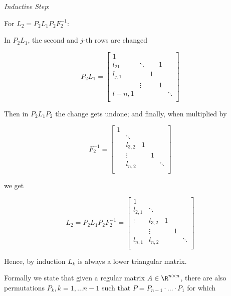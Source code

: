 \emph{Inductive Step}:

For \(L_2 = P_2 L_1 P_2 F_{2}^{-1}\): 

In \(P_2 L_1\), the second and \(j\)-th rows are changed

\[
    P_2 L_1= 
        \begin{bmatrix}
            1 &        &         &   &        \\
             l_{2 1}& \ddots &         &  1 &        \\
             l_{j,1} &        & 1       &   &        \\
            & \vdots       &  & 1 &        \\
            l-{n,1} &        &        &   & \ddots \\
        \end{bmatrix}
\]

Then in \(P_2 L_1 P_2\) the change gets undone; and finally, when multiplied by 

\[
    F_{2}^{-1} =     
        \begin{bmatrix}
            1 &        &         &   &        \\
              & \ddots &         &   &        \\
              &  l_{3,2}     & 1       &   &        \\
              &   \vdots    &  & 1 &        \\
              &  l_{n,2}      &        &   & \ddots \\
        \end{bmatrix}
\]

we get 

\[
    L_2 = P_2 L_1 P_2 F_{2}^{-1} =     
        \begin{bmatrix}
            1 &        &         &   &        \\
            l_{2,1}  & \ddots &         &   &        \\
            \vdots  &  l_{3,2}     & 1       &   &        \\
              &   \vdots    &  & 1 &        \\
            l_{n, 1}  &  l_{n,2}      &        &   & \ddots \\
        \end{bmatrix}
\]

Hence, by induction \(L_k\) is always a lower triangular matrix.

\QED

Formally we state that given a regular matrix \(A \in \R^{n \times n}\), there are also permutations \(P_k, k = 1, \dots n - 1\) such that 
\(P = P_{n-1} \cdot \dots \cdot P_1\) for which 


